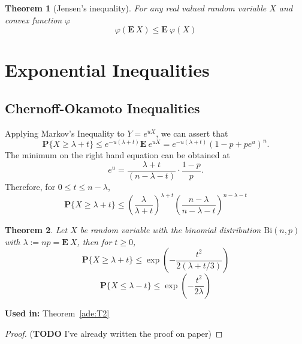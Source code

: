 \documentclass[12pt]{exam}
\def\E{\ensuremath{\mathbf{E}}\:}
\def\P{\ensuremath{\mathbf{P}}}
\def\Bi{\ensuremath{\mathrm{Bi}}}
\newtheorem{theorem}{Theorem}[section]
\theoremstyle{remark}
\begin{document}
\begin{theorem}[Jensen's inequality]\label{jensen}
  For any real valued random variable $X$ and convex function $\varphi$
  \[ \varphi(\E X) \leq \E \varphi(X) \] 
\end{theorem}

\section{Exponential Inequalities}


\subsection{Chernoff-Okamoto Inequalities}


Applying Markov's Inequality to $Y = e^{uX}$, we can assert that
  \[
    \P\{X \geq \lambda + t\} \leq e^{-u(\lambda+t)} \E e^{uX} = e^{-u(\lambda+ t)} {(1-p + p e^{u})}^n. 
  \] 
  The minimum on the right hand equation can be obtained at
  \[ e^{u} = \frac{\lambda+t}{(n-\lambda-t)} \cdot \frac{1-p}{p}. \]
  Therefore, for $0 \leq t \leq n-\lambda$,
  \begin{equation}\label{co:1}
    \P\{X \geq \lambda + t\} \leq {\left(\frac{\lambda}{\lambda+t}\right)}^{\lambda + t} {\left(\frac{n-\lambda}{n-\lambda-t}\right)}^{n - \lambda - t}
  \end{equation}

\begin{theorem}\label{co:T1}
  Let $X$ be random variable with the binomial distribution $\Bi(n,p)$ with $\lambda := np = \E X$, then for $t \geq 0$,
  \begin{equation}\label{co:2}
    \P\{X \geq \lambda + t\} \leq \exp\left(- \frac{t^2}{2(\lambda+t/3)}\right)
  \end{equation}
  \begin{equation}\label{co:3}
    \P\{X \leq \lambda - t\} \leq \exp\left(- \frac{t^2}{2\lambda}\right)
  \end{equation}
\end{theorem}

\textbf{Used in:} Theorem~\ref*{ade:T2}

\begin{proof}
  (\textbf{TODO} I've already written the proof on paper)
\end{proof}
\end{document}
